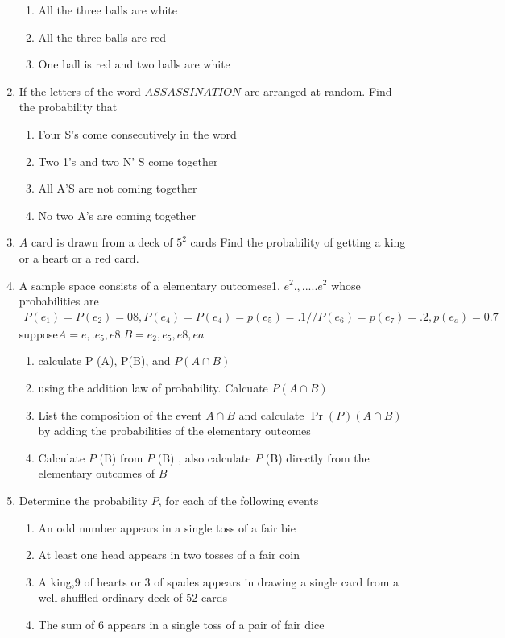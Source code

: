 \documentclass[12pt]{article}
\providecommand{\pr}[1]{\ensuremath{\Pr\left(#1\right)}}
\begin{document}
\begin{enumerate}
\begin{enumerate}
\item All the three balls are white\item All the three balls are red
\item One ball is red and two balls are white
	\end{enumerate}
\item If the letters of the word $ASSASSINATION$ are arranged at random. Find the probability that
	\begin{enumerate}
\item Four S's come consecutively in the word
\item Two 1's and two N' S  come together
\item All A'S are not coming together
\item No two A's are coming together
	\end{enumerate}
\item $A$ card is drawn from a deck of $5^2$ cards Find the probability of getting a king or a heart or a red card.
\item A sample space consists of a elementary outcomese1, $e^2.,.....e^2$ whose probabilities are
	\begin{align}
 P(e_1)=P(e_2)=08, P(e_4)=P(e_4)=p(e_5)=.1//
P(e_6)=p(e_7)=.2,p(e_a)=0.7
	\end{align}
suppose$A={e,.e_5,e8}.B={e_2,e_5,e8, ea}$
\begin{enumerate}
\item calculate P (A), P(B), and $P(A\cap B)$
\item using the addition law of probability. Calcuate $P(A\cap B)$
\item List the composition of the event $A\cap B$ and calculate $\pr{P} (A\cap B)$ by adding the probabilities of the elementary outcomes
\item Calculate $P$ (B) from $P$ (B) , also calculate $P$ (B) directly from the elementary outcomes of $B$
	\end{enumerate}
\item Determine the probability $P$, for each of the following events
	\begin{enumerate}
\item An odd number appears in a single toss of a fair bie
\item At least one head appears in two tosses of a fair coin 
\item A king,9 of hearts or 3 of spades appears in drawing a single card from a well-shuffled ordinary deck of 52 cards
\item The sum of 6 appears in a single toss of a pair of fair dice

\end{enumerate}
\end{enumerate}
\end{document}
